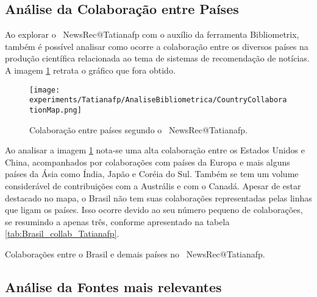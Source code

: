 \subsection{Análise da Colaboração entre Países}

Ao explorar o \dataset\  NewsRec@Tatianafp com o auxílio da ferramenta Bibliometrix, também é possível analisar como ocorre a colaboração entre os diversos países na produção científica relacionada ao tema de sistemas de recomendação de notícias. A imagem \ref{fig:country_collab_NewsRec_Tatianafp} retrata o gráfico que fora obtido. 

\begin{figure}
    \centering
    \texttt{[image: experiments/Tatianafp/AnaliseBibliometrica/CountryCollaborationMap.png]}
    \caption{Colaboração entre países segundo o \dataset\  NewsRec@Tatianafp.}
    \label{fig:country_collab_NewsRec_Tatianafp}
\end{figure}

Ao analisar a imagem \ref{fig:country_collab_NewsRec_Tatianafp} nota-se uma alta colaboração entre os Estados Unidos e China, acompanhados por colaborações com países da Europa e mais alguns países da Ásia como Índia, Japão e Coréia do Sul. Também se tem um volume considerável de contribuições com a Austrális e com o Canadá. Apesar de estar destacado no mapa, o Brasil não tem suas colaborações representadas pelas linhas que ligam os países. Isso ocorre devido ao seu número pequeno de colaborações, se resumindo a apenas três, conforme apresentado na tabela \ref{tab:Brasil_collab_Tatianafp}. 

\begin{table}[htp]
    \centering
\footnotesize
{}

    \caption{Colaborações entre o Brasil e demais países no \dataset\ NewsRec@Tatianafp.}
    \label{tab:Brasil_collab_Tatianafp}
\end{table}

\subsection{Análise da Fontes mais relevantes }


